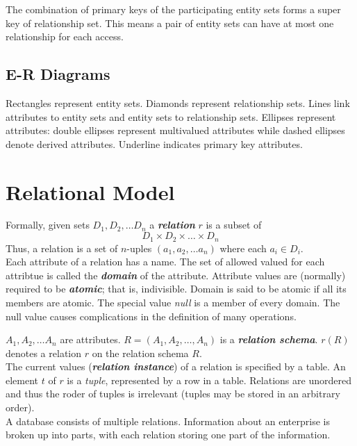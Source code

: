 \documentclass{article}
\newcommand{\define}[1]{\textbf{\textit{#1}}}
\begin{document}
The combination of primary keys of the participating entity sets forms a super key of relationship set. This means a pair of entity sets can have at most one relationship for each access. 

\subsection{E-R Diagrams}

Rectangles represent entity sets. Diamonds represent relationship sets. Lines link attributes to entity sets and entity sets to relationship sets. Ellipses represent attributes: double ellipses represent multivalued attributes while dashed ellipses denote derived attributes. Underline indicates primary key attributes. 

\section{Relational Model}

Formally, given sets $D_1 , D_2 , \dots D_n$ a \define{relation} $r$ is a subset of $$D_1 \times D_2 \times \dots \times D_n$$ Thus, a relation is a set of $n$-uples $(a_1 , a_2 , \dots a_n)$ where each $a_i \in D_i$. \\ 

Each attribute of a relation has a name. The set of allowed valued for each attribtue is called the \define{domain} of the attribute. Attribute values are (normally) required to be \define{atomic}; that is, indivisible. Domain is said to be atomic if all its members are atomic. The special value \emph{null} is a member of every domain. The null value causes complications in the definition of many operations. 
 
$A_1 , A_2 , \dots A_n$ are attributes. $R= (A_1 , A_2 , \dots , A_n)$ is a \define{relation schema}. $r(R)$ denotes a relation $r$ on the relation schema $R$. \\ 

The current values (\define{relation instance}) of a relation is specified by a table. An element $t$ of $r$ is a \emph{tuple}, represented by a row in a table. Relations are unordered and thus the roder of tuples is irrelevant (tuples may be stored in an arbitrary order). \\ 

A database consists of multiple relations. Information about an enterprise is broken up into parts, with each relation storing one part of the information. 
\end{document}
